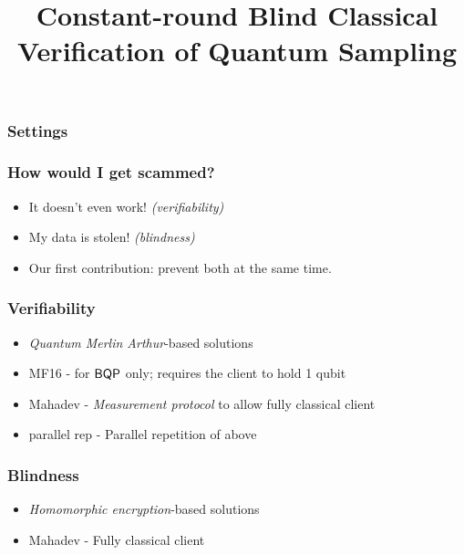 \documentclass{beamer}
\title{Constant-round Blind Classical Verification of Quantum Sampling}
\begin{document}
\begin{frame}
	\titlepage
\end{frame}

\begin{frame}
	\frametitle{Settings}


	\begin{flushright}
	\end{flushright}
\end{frame}

\begin{frame}
	\frametitle{How would I get scammed?}
	\pause
	\begin{itemize}[<+->]
		\item It doesn't even work! \emph{(verifiability)}
		\item My data is stolen! \emph{(blindness)}
		\item Our first contribution: prevent both at the same time.
	\end{itemize}
\end{frame}

\begin{frame}
	\frametitle{Verifiability}
	\begin{itemize}[<+->]
		\item \emph{Quantum Merlin Arthur}-based solutions
		\item MF16 - for $\operatorname{\mathsf{BQP}}$ only; requires the client to hold 1 qubit
		\item Mahadev - \emph{Measurement protocol} to allow fully classical client
		\item parallel rep - Parallel repetition of above
	\end{itemize}
\end{frame}

\begin{frame}
	\frametitle{Blindness}
	\begin{itemize}[<+->]
		\item \emph{Homomorphic encryption}-based solutions
		\item Mahadev - Fully classical client
	\end{itemize}
\end{frame}
\end{document}
